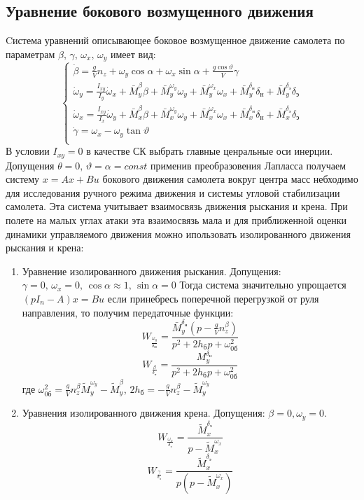 \documentclass{article}
\begin{document}
\subsection{Уравнение бокового возмущенного движения}
Cистема уравнений описывающее боковое возмущенное движение самолета по параметрам $\beta, \, \gamma, \, \omega_x, \, \omega_y$ имеет вид:
\begin{equation}
\begin{cases}
\dot{\beta} = \frac{g}{V} n_z + \omega_y \cos{\alpha} + \omega_x \sin{\alpha} + \frac{g\cos{\vartheta}}{V} \gamma \\
\dot{\omega}_y = \frac{I_{xy}}{I_{y}} \dot{\omega}_x + \bar{M}_y^\beta \beta + \bar{M}_y^{\omega_y} \omega_y + \bar{M}_y^{\omega_x} \omega_x + \bar{M}_y^{\delta_н} \delta_н + \bar{M}_y^{\delta_э} {\delta}_э \\
\dot{\omega}_x = \frac{I_{xy}}{I_{x}} \dot{\omega}_y + \bar{M}_x^\beta \beta + \bar{M}_x^{\omega_y} \omega_y + \bar{M}_x^{\omega_x} \omega_x + \bar{M}_x^{\delta_н} \delta_н + \bar{M}_x^{\delta_э} {\delta}_э \\
\dot{\gamma} = \omega_x - \omega_ y \tan{\vartheta} \\ 
\end{cases}
\end{equation}
В условии $I_{xy} = 0$ в качестве СК выбрать главные ценральные оси инерции.\\
Допущения $\theta = 0, \, \vartheta = \alpha = const$ применив преобразовения Лапласса получаем 
систему $x = Ax + Bu$ бокового движения самолета вокруг центра масс небходимо для исследования ручного режима движения и системы угловой стабилизации самолета. Эта система учитывает взаимосвязь движения рыскания и крена. При полете на малых углах атаки эта взаимосвязь мала и для приближенной оценки динамики управляемого движения можно ипользовать изолированного движения рыскания и крена:\\
\begin{enumerate}
\item Уравнение изолированного движения рыскания. Допущения: $\gamma = 0, \, \omega_x = 0, \, \cos{\alpha} \approx 1,\,\sin{\alpha} = 0$
Тогда система значительно упрощается 
$(pI_n - A)x = B u$
если принебресь поперечной перегрузкой от руля направления, то получим передаточные функции:
\[
W_{\frac{\omega_y}{\delta_Н}}= \frac{\bar{M}_y^{\delta_н}(p - \frac{g}{V} n_z^\beta)}{p^2 + 2h_бp + \omega^2_{0б}}
\]
\[
W_{\frac{\beta}{\delta_н}} = \frac{M_y^{\delta_н}}{p^2 + 2h_бp + \omega^2_{0б}}
\]
где $\omega_{0б}^2 = \frac{g}{V} n_z^\beta \tilde{M}_y^{\omega_y} - \tilde{M}_y^\beta$, $2h_б = -\frac{g}{V}n_z^\beta - \tilde{M}_y^{\omega_y}$
\item Уравнения изолированного движения крена. Допущения: $\beta = 0, \omega_y = 0$.
\[
W_{\frac{\omega_x}{\delta_э}} = \frac{\tilde{M}_x^{\delta_э}}{p - \tilde{M}_x^{\omega_x}}
\]
\[
W_{\frac{\gamma}{\delta_э}} = \frac{\tilde{M}_x^{\delta_э}}{p(p - \tilde{M}_x^{\omega_x})}
\]
\end{enumerate}
\newpage
\end{document}
